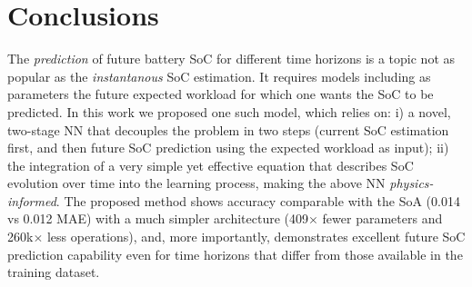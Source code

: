 \section{Conclusions}
\label{sec:conclusions}
The \textit{prediction} of future battery SoC for different time horizons is a topic not as popular as the \textit{instantanous} SoC estimation. It requires models including as parameters the future expected workload for which one wants the SoC to be predicted.
%
In this work we proposed one such model, which relies on: i) a novel, two-stage NN that decouples the problem in two steps (current SoC estimation first, and then future SoC prediction using the expected workload as input); ii) the integration of a very simple yet effective equation that describes SoC evolution over time into the learning process, making the above NN \textit{physics-informed}. 
The proposed method shows accuracy comparable with the SoA (0.014 vs 0.012 MAE) with a much simpler architecture (409$\times$ fewer parameters and 260k$\times$ less operations), and, more importantly, demonstrates excellent future SoC prediction capability even for time horizons that differ from those available in the training dataset.
%
